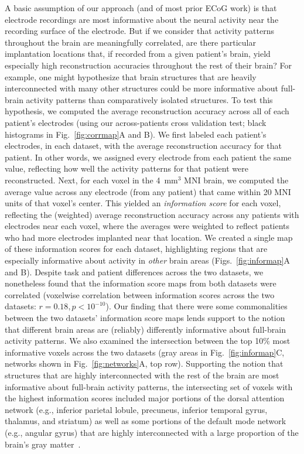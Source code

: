 \documentclass[11pt]{article}
\begin{document}
A basic assumption of our approach (and of most prior ECoG work) is that
electrode recordings are most informative about the neural activity near the
recording surface of the electrode.  But if we consider that activity patterns
throughout the brain are meaningfully correlated, are there particular
implantation locations that, if recorded from a given patient's brain, yield
especially high reconstruction accuracies throughout the rest of their brain?
For example, one might hypothesize that brain structures that are heavily
interconnected with many other structures could be more informative about
full-brain activity patterns than comparatively isolated structures.  To test
this hypothesis, we computed the average reconstruction accuracy across all of
each patient's electrodes (using our across-patients cross validation test;
black histograms in Fig.~\ref{fig:corrmap}A and B).  We first labeled each
patient's electrodes, in each dataset, with the average reconstruction accuracy
for that patient.  In other words, we assigned every electrode from each patient
the same value, reflecting how well the activity patterns for that patient were
reconstructed. Next, for each voxel in the 4~mm$^3$ MNI brain, we computed the
average value across any electrode (from any patient) that came within 20 MNI
units of that voxel's center.  This yielded an \textit{information score} for
each voxel, reflecting the (weighted) average reconstruction accuracy across any
patients with electrodes near each voxel, where the averages were weighted to
reflect patients who had more electrodes implanted near that location. We
created a single map of these information scores for each dataset, highlighting
regions that are especially informative about activity in \textit{other} brain
areas (Figs.~\ref{fig:informap}A and B).  Despite task and patient differences
across the two datasets, we nonetheless found that the information score maps
from both datasets were correlated (voxelwise correlation between information
scores across the two datasets: $r = 0.18, p < 10^{-10}$).  Our finding that
there were some commonalities between the two datasets' information score maps
lends support to the notion that different brain areas are (reliably)
differently informative about full-brain activity patterns.  We also examined
the intersection between the top 10\% most informative voxels across the two
datasets (gray areas in Fig.~\ref{fig:informap}C, networks shown in
Fig.~\ref{fig:networks}A, top row). Supporting the notion that structures that
are highly interconnected with the rest of the brain are most informative about
full-brain activity patterns, the intersecting set of voxels with the highest
information scores included major portions of the dorsal attention network
(e.g., inferior parietal lobule, precuneus, inferior temporal gyrus, thalamus,
and striatum) as well as some portions of the default mode network (e.g.,
angular gyrus) that are highly interconnected with a large proportion of the
brain's gray matter~\citep[e.g.,][]{TomaVolk11}.
\end{document}
